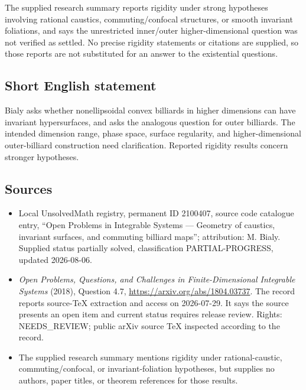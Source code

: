 \documentclass[11pt]{article}
\begin{document}
The supplied research summary reports rigidity under strong hypotheses involving rational caustics, commuting/confocal structures, or smooth invariant foliations, and says the unrestricted inner/outer higher-dimensional question was not verified as settled. No precise rigidity statements or citations are supplied, so those reports are not substituted for an answer to the existential questions.
\subsection{Short English statement}
Bialy asks whether nonellipsoidal convex billiards in higher dimensions can have invariant hypersurfaces, and asks the analogous question for outer billiards. The intended dimension range, phase space, surface regularity, and higher-dimensional outer-billiard construction need clarification. Reported rigidity results concern stronger hypotheses.
\subsection{Sources}
\begin{itemize}
\item Local UnsolvedMath registry, permanent ID 2100407, source code catalogue entry, ``Open Problems in Integrable Systems --- Geometry of caustics, invariant surfaces, and commuting billiard maps''; attribution: M. Bialy. Supplied status partially solved, classification PARTIAL-PROGRESS, updated 2026-08-06.
\item \emph{Open Problems, Questions, and Challenges in Finite-Dimensional Integrable Systems} (2018), Question 4.7, \url{https://arxiv.org/abs/1804.03737}. The record reports source-TeX extraction and access on 2026-07-29. It says the source presents an open item and current status requires release review. Rights: NEEDS\_REVIEW; public arXiv source TeX inspected according to the record.
\item The supplied research summary mentions rigidity under rational-caustic, commuting/confocal, or invariant-foliation hypotheses, but supplies no authors, paper titles, or theorem references for those results.
\end{itemize}
\end{document}
